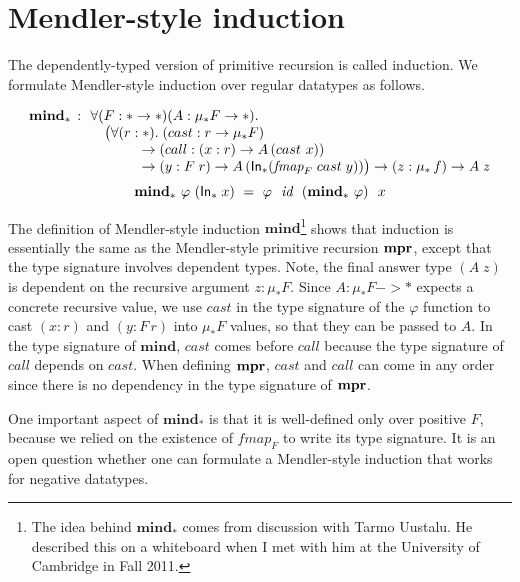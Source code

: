 \section{Mendler-style induction}
\label{sec:relwork:dep}
The dependently-typed version of primitive recursion is called induction.
We formulate Mendler-style induction over regular datatypes as follows.
\vspace*{-2em}
\begin{singlespace}
\[\begin{array}{ll}
\textbf{mind}_{*} \, :
& \!\!\forall (F:* -> *) (A: \mu_{*}F -> *). \\
& ~~ \big(\forall(r:*).\;(cast : r -> \mu_{*}F) \\
& ~\qquad\quad -> (call : (x:r) -> A\,(cast~x)) \\
& ~\qquad\quad -> (y: F\;r) -> A\,(\mathsf{In}_{*}(\textit{fmap}_{F}\;cast\;y)) \big) 
-> (z:\mu_{*}\,f) -> A\;z
\end{array}
\]
\[
\textbf{mind}_{*} ~ \varphi ~ (\mathsf{In}_{*}\;x)
  ~=~ \varphi~~\textit{id}~~(\textbf{mind}_{*}~\varphi)~~x \]
\end{singlespace}\noindent
The definition of Mendler-style induction $\textbf{mind}$\footnote{
	The idea behind $\textbf{mind}_{*}$ comes from discussion with
	Tarmo Uustalu. He described this on a whiteboard when I met with him
	at the University of Cambridge in Fall 2011.}
shows that induction is essentially the same as
the Mendler-style primitive recursion $\mathbf{mpr}$, except
that the type signature involves dependent types.
Note, the final answer type $(A\;z)$ is dependent on
the recursive argument $z:\mu_{*}F$.
Since $A: \mu_{*}F -> *$ expects a concrete recursive value,
we use $cast$ in the type signature of the $\varphi$ function
to cast $(x:r)$ and $(y:F\,r)$ into $\mu_{*}F$ values, so that
they can be passed to $A$.
In the type signature of $\textbf{mind}$, $cast$ comes before $call$
because the type signature of $call$ depends on $cast$.
When defining $\mathbf{mpr}$, $cast$ and $call$ can come in any order
since there is no dependency in the type signature of $\mathbf{mpr}$.

One important aspect of $\textbf{mind}_{*}$ is that
it is well-defined only over positive $F$, because we relied on
the existence of $\textit{fmap}_F$ to write its type signature.
It is an open question whether one can formulate a Mendler-style induction
that works for negative datatypes.

